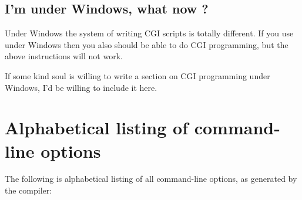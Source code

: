 \documentclass{report}
\begin{document}
\section{I'm under Windows, what now ?}
Under Windows the system of writing CGI scripts is totally different. If you
use \fpk under Windows then you also should be able to do CGI programming,
but the above instructions will not work. 

If some kind soul is willing to write a section on CGI programming under
Windows, I'd be willing to include it here.
\appendix



\chapter{Alphabetical listing of command-line options}
The following is alphabetical listing of all command-line options, as
generated by the compiler:
\end{document}
